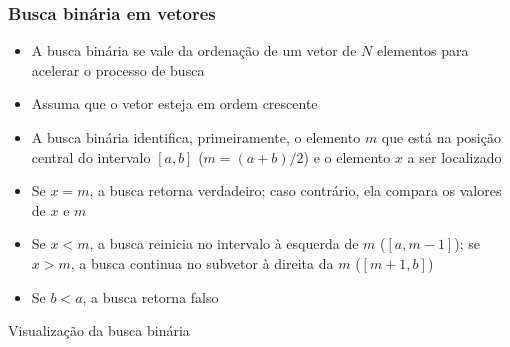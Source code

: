 \begin{frame}[fragile]\frametitle{Busca binária em vetores}

	\begin{itemize}
		\item A busca binária se vale da ordenação de um vetor de $N$ elementos para acelerar o 
        processo de busca

		\item Assuma que o vetor esteja em ordem crescente

        \item A busca binária identifica, primeiramente, o elemento $m$ que está na posição
            central do intervalo $[a, b]$ ($m = (a + b)/2$) e o elemento $x$ a ser localizado

        \item Se $x = m$, a busca retorna verdadeiro; caso contrário, ela compara os valores de $x$         e $m$

        \item Se $x < m$, a busca reinicia no intervalo à esquerda de $m$ ($[a, m - 1]$); 
        se $x > m$, a busca continua no subvetor à direita da $m$ ($[m + 1, b]$)

        \item Se $b < a$, a busca retorna falso
	\end{itemize}
 
\end{frame}  

\begin{frame}[fragile]{Visualização da busca binária}


\end{frame}

